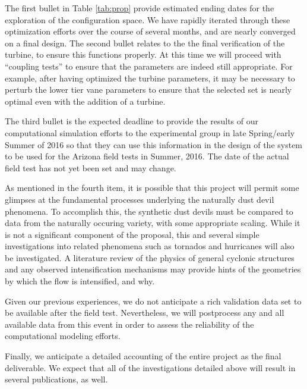 %
%

The first bullet in Table \ref{tab:prop} provide
estimated ending dates for the exploration of the configuration space. 
We have rapidly iterated 
through these optimization efforts over the course of several
months, and are nearly converged on a final design. 
The second bullet relates to the the final verification of the turbine, to ensure
this functions properly. 
At this time we will proceed with ``coupling tests'' to 
ensure that the parameters are indeed still appropriate. For example,
after having optimized the turbine parameters, it may be necessary to
perturb the lower tier vane parameters to ensure that the selected set
is nearly optimal even with the addition of a turbine. 

%
%
The third bullet is the expected deadline to provide the results of our
computational simulation efforts to the experimental group in late
Spring/early Summer of 2016 so that they can use this information in the
design of the system to be used for the Arizona field tests in Summer,
2016. The date of the actual field test has not yet been set and may change. 

As mentioned in the fourth item, it is possible that this
project will permit some glimpses  
at the fundamental processes underlying the naturally dust devil
phenomena. To accomplish this, the synthetic dust devils must be
compared to data from the naturally occuring variety,  with some
appropriate scaling. While it is not a significant component of the
proposal, this and several simple investigations into related phenomena
such as tornados and hurricanes will also  be investigated. A literature
review of the physics of general cyclonic structures and any observed
intensification mechanisms may provide hints of the geometries 
by which the flow is intensified, and why. 

Given our previous experiences, we do not anticipate a rich validation data set 
to be available after the field test. Nevertheless, we will postprocess any and all
available data from this event in order to assess the reliability of the computational
modeling efforts. 

Finally, we anticipate a detailed accounting of the entire project as
the final deliverable. We expect that all of the investigations detailed 
above will result in several publications, as well. 

%
%

